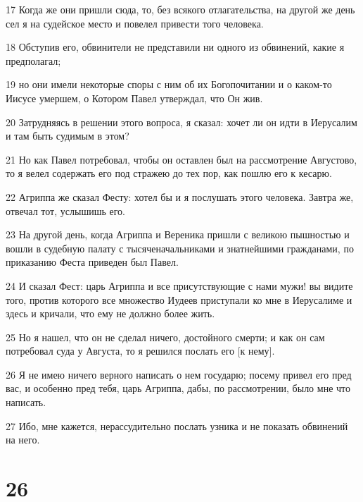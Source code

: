 \par 17 Когда же они пришли сюда, то, без всякого отлагательства, на другой же день сел я на судейское место и повелел привести того человека.
\par 18 Обступив его, обвинители не представили ни одного из обвинений, какие я предполагал;
\par 19 но они имели некоторые споры с ним об их Богопочитании и о каком-то Иисусе умершем, о Котором Павел утверждал, что Он жив.
\par 20 Затрудняясь в решении этого вопроса, я сказал: хочет ли он идти в Иерусалим и там быть судимым в этом?
\par 21 Но как Павел потребовал, чтобы он оставлен был на рассмотрение Августово, то я велел содержать его под стражею до тех пор, как пошлю его к кесарю.
\par 22 Агриппа же сказал Фесту: хотел бы и я послушать этого человека. Завтра же, отвечал тот, услышишь его.
\par 23 На другой день, когда Агриппа и Вереника пришли с великою пышностью и вошли в судебную палату с тысяченачальниками и знатнейшими гражданами, по приказанию Феста приведен был Павел.
\par 24 И сказал Фест: царь Агриппа и все присутствующие с нами мужи! вы видите того, против которого все множество Иудеев приступали ко мне в Иерусалиме и здесь и кричали, что ему не должно более жить.
\par 25 Но я нашел, что он не сделал ничего, достойного смерти; и как он сам потребовал суда у Августа, то я решился послать его [к нему].
\par 26 Я не имею ничего верного написать о нем государю; посему привел его пред вас, и особенно пред тебя, царь Агриппа, дабы, по рассмотрении, было мне что написать.
\par 27 Ибо, мне кажется, нерассудительно послать узника и не показать обвинений на него.

\chapter{26}

